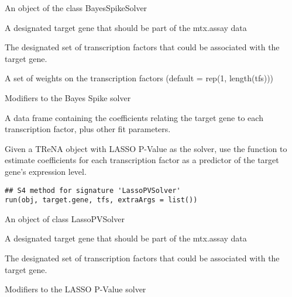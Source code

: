 \documentclass[a4paper]{book}
\begin{document}
%
\begin{Arguments}
\begin{ldescription}
\item[\code{obj}] An object of the class BayesSpikeSolver

\item[\code{target.gene}] A designated target gene that should be part of the mtx.assay data

\item[\code{tfs}] The designated set of transcription factors that could be associated with the target gene.

\item[\code{tf.weights}] A set of weights on the transcription factors (default = rep(1, length(tfs)))

\item[\code{extraArgs}] Modifiers to the Bayes Spike solver
\end{ldescription}
\end{Arguments}
%
\begin{Value}
A data frame containing the coefficients relating the target gene to each transcription factor, plus other fit parameters.
\end{Value}
%
\begin{SeeAlso}\relax
{}
\end{SeeAlso}
%
\begin{Description}\relax
Given a TReNA object with LASSO P-Value as the solver, use the  function to estimate coefficients
for each transcription factor as a predictor of the target gene's expression level.
\end{Description}
%
\begin{Usage}
\begin{verbatim}
## S4 method for signature 'LassoPVSolver'
run(obj, target.gene, tfs, extraArgs = list())
\end{verbatim}
\end{Usage}
%
\begin{Arguments}
\begin{ldescription}
\item[\code{obj}] An object of class LassoPVSolver

\item[\code{target.gene}] A designated target gene that should be part of the mtx.assay data

\item[\code{tfs}] The designated set of transcription factors that could be associated with the target gene.

\item[\code{extraArgs}] Modifiers to the LASSO P-Value solver
\end{ldescription}
\end{Arguments}
\end{document}
